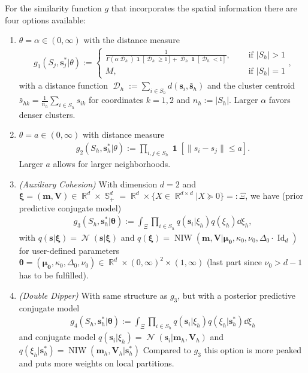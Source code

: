 \documentclass[12pt,a4paper]{article}
\DeclareMathOperator{\Normal}{\mathcal{N}}
\DeclareMathOperator{\DD}{\mathcal{D}}
\DeclareMathOperator{\indicator}{\pmb{1}}
\DeclareMathOperator{\NormInvWish}{\mathrm{NIW}}
\DeclareMathOperator{\RR}{\mathbb{R}}
\DeclareMathOperator{\Identity}{\mathrm{Id}}
\DeclareMathOperator{\PosSemDef}{\mathbb{S}}
\begin{document}
For the similarity function $g$ that incorporates the spatial information there are four options available:

\begin{enumerate}
    \item $\theta = \alpha \in (0,\infty)$ with the distance measure
    \begin{align*}
        g_1(S_j, \pmb{s}_j^* \vert \theta) := \begin{cases}
            \frac{1}{\Gamma(\alpha \DD_h) \indicator[\DD_h \geq 1] + \DD_h \indicator[\DD_h < 1]}, &\quad \text{ if } \vert S_h \vert > 1\\
            M, &\quad \text{ if } \vert S_h \vert = 1
        \end{cases},
    \end{align*}
    with a distance function $\DD_h := \sum_{i \in S_h} d(\pmb{s}_i, \bar{\pmb{s}}_h)$ and the cluster centroid
    $\bar{s}_{hk} = \frac{1}{n_h} \sum_{i\in S_h} s_{ik}$ for coordinates $k=1,2$ and $n_h := \vert S_h \vert$. Larger $\alpha$ favors denser clusters. 
    
    \item $\theta = a \in (0, \infty)$ with distance measure
    \begin{align*}
        g_2(S_h, \pmb{s}_h^* \vert \theta) := \prod_{i, j \in S_h} \indicator\left[\lVert s_i - s_j\rVert \leq a \right].
    \end{align*}
    Larger $a$ allows for larger neighborhoods.
    
    \item  \textit{(Auxiliary Cohesion)} With dimension $d=2$ and
    $\pmb{\xi} = (\pmb{m}, \pmb{V}) \in \RR^d \times \PosSemDef_+^d = \RR^d \times \{X \in \RR^{d\times d} \vert X \succeq 0\} =: \Xi$, we have (prior predictive conjugate model)
    \begin{align*}
        g_3(S_h, \pmb{s}_h^* \vert \pmb{\theta}) := \int_{\Xi} \prod_{i \in S_h} q(\pmb{s}_i \vert \xi_h) q(\xi_h) \dd \xi_h,
    \end{align*}
    with $q(\pmb{s}\vert \pmb{\xi}) = \Normal(\pmb{s}\vert \pmb{\xi})$ and $q(\pmb{\xi}) = \NormInvWish(\pmb{m}, \pmb{V} \vert \pmb{\mu_0}, \kappa_0, \nu_0, \Delta_0 \cdot \Identity_d)$
    for user-defined parameters 
    $\pmb{\theta} = \left(\pmb{\mu_0}, \kappa_0, \Delta_0, \nu_0\right) \in \RR^d \times (0, \infty)^2 \times (1, 
    \infty)$ (last part since $\nu_0 > d -1$ has to be fulfilled).
    
    \item \textit{(Double Dipper)} With same structure as $g_3$, but with a posterior predictive conjugate model
    \begin{align*}
        g_4(S_h, \pmb{s}_h^* \vert \pmb{\theta}) := \int_{\Xi} \prod_{i \in S_h} q(\pmb{s}_i \vert 
        \xi_h) q(\xi_h\vert \pmb{s}_h^*) \dd \xi_h
    \end{align*}
    and conjugate model $q(\pmb{s}_i \vert 
        \xi_h) = \Normal(\pmb{s}_i \vert \pmb{m}_h, \pmb{V}_h)$ and $q(\xi_h\vert \pmb{s}_h^*) = 
        \NormInvWish(\pmb{m}_h, \pmb{V}_h \vert \pmb{s}_h^*)$
    Compared to $g_3$ this option is more peaked and puts more weights on local partitions.
\end{enumerate}
\end{document}
